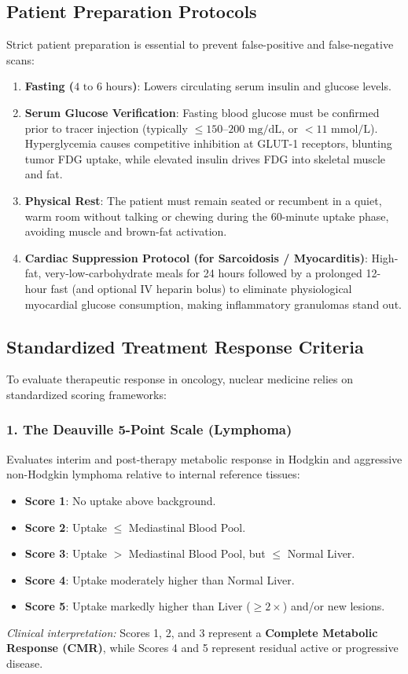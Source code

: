 \documentclass[11pt,a4paper]{article}
\begin{document}
\subsection{Patient Preparation Protocols}
Strict patient preparation is essential to prevent false-positive and false-negative scans:
\begin{enumerate}
    \item \textbf{Fasting ($4\text{ to }6\text{ hours}$)}: Lowers circulating serum insulin and glucose levels.
    \item \textbf{Serum Glucose Verification}: Fasting blood glucose must be confirmed prior to tracer injection (typically $\le 150\text{--}200\text{ mg/dL}$, or $<11\text{ mmol/L}$). Hyperglycemia causes competitive inhibition at GLUT-1 receptors, blunting tumor FDG uptake, while elevated insulin drives FDG into skeletal muscle and fat.
    \item \textbf{Physical Rest}: The patient must remain seated or recumbent in a quiet, warm room without talking or chewing during the 60-minute uptake phase, avoiding muscle and brown-fat activation.
    \item \textbf{Cardiac Suppression Protocol (for Sarcoidosis / Myocarditis)}: High-fat, very-low-carbohydrate meals for 24 hours followed by a prolonged 12-hour fast (and optional IV heparin bolus) to eliminate physiological myocardial glucose consumption, making inflammatory granulomas stand out.
\end{enumerate}

\subsection{Standardized Treatment Response Criteria}
To evaluate therapeutic response in oncology, nuclear medicine relies on standardized scoring frameworks:

\subsubsection{1. The Deauville 5-Point Scale (Lymphoma)}
Evaluates interim and post-therapy metabolic response in Hodgkin and aggressive non-Hodgkin lymphoma relative to internal reference tissues:
\begin{itemize}
    \item \textbf{Score 1}: No uptake above background.
    \item \textbf{Score 2}: Uptake $\le$ Mediastinal Blood Pool.
    \item \textbf{Score 3}: Uptake $>$ Mediastinal Blood Pool, but $\le$ Normal Liver.
    \item \textbf{Score 4}: Uptake moderately higher than Normal Liver.
    \item \textbf{Score 5}: Uptake markedly higher than Liver ($\ge 2\times$) and/or new lesions.
\end{itemize}
\emph{Clinical interpretation:} Scores 1, 2, and 3 represent a \textbf{Complete Metabolic Response (CMR)}, while Scores 4 and 5 represent residual active or progressive disease.
\end{document}
